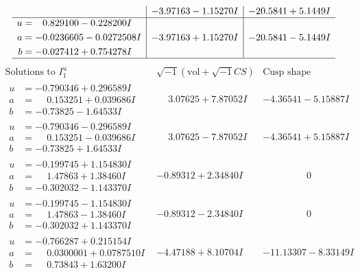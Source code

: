 \documentclass[1p]{elsarticle_modified}
\theoremstyle{definition}
\newcommand{\I}{\sqrt{-1}}
\begin{document}
$$\begin{array}{c|c|c}
 & -3.97163 - 1.15270 I & -20.5841 + 5.1449 I \\ \hline\begin{aligned}
u &= \phantom{-}0.829100 - 0.228200 I \\
a &= -0.0236605 - 0.0272508 I \\
b &= -0.027412 + 0.754278 I\end{aligned}
 & -3.97163 + 1.15270 I & -20.5841 - 5.1449 I\\
 \hline 
 \end{array}$$\newpage$$\begin{array}{c|c|c}  
\text{Solutions to }I^u_{1}& \I (\text{vol} + \sqrt{-1}CS) & \text{Cusp shape}\\
 \hline 
\begin{aligned}
u &= -0.790346 + 0.296589 I \\
a &= \phantom{-}0.153251 + 0.039686 I \\
b &= -0.73825 - 1.64533 I\end{aligned}
 & \phantom{-}3.07625 + 7.87052 I & -4.36541 - 5.15887 I \\ \hline\begin{aligned}
u &= -0.790346 - 0.296589 I \\
a &= \phantom{-}0.153251 - 0.039686 I \\
b &= -0.73825 + 1.64533 I\end{aligned}
 & \phantom{-}3.07625 - 7.87052 I & -4.36541 + 5.15887 I \\ \hline\begin{aligned}
u &= -0.199745 + 1.154830 I \\
a &= \phantom{-}1.47863 + 1.38460 I \\
b &= -0.302032 - 1.143370 I\end{aligned}
 & -0.89312 + 2.34840 I & \phantom{-0.000000 } 0 \\ \hline\begin{aligned}
u &= -0.199745 - 1.154830 I \\
a &= \phantom{-}1.47863 - 1.38460 I \\
b &= -0.302032 + 1.143370 I\end{aligned}
 & -0.89312 - 2.34840 I & \phantom{-0.000000 } 0 \\ \hline\begin{aligned}
u &= -0.766287 + 0.215154 I \\
a &= \phantom{-}0.0300001 + 0.0787510 I \\
b &= \phantom{-}0.73843 + 1.63200 I\end{aligned}
 & -4.47188 + 8.10704 I & -11.13307 - 8.33149 I \\ \hline\begin{aligned}

\end{aligned}
\end{array}$$
\end{document}

